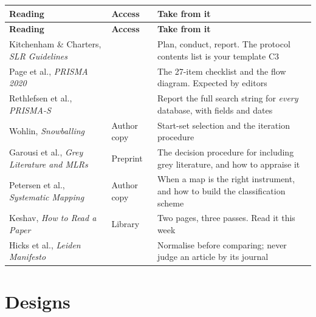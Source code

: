 \begin{center}
\small
\begin{longtable}{@{}L{4.4cm}L{1.8cm}L{7.6cm}@{}}
\toprule
\textbf{Reading} & \textbf{Access} & \textbf{Take from it} \\
\midrule
\endfirsthead
\toprule
\textbf{Reading} & \textbf{Access} & \textbf{Take from it} \\
\midrule
\endhead
\bottomrule
\endfoot
Kitchenham \& Charters, \emph{SLR Guidelines}~\cite{kitchenham2007guidelines}
  & \oa{}
  & Plan, conduct, report. The protocol contents list is your template C3 \\
Page et al., \emph{PRISMA 2020}~\cite{page2021prisma}
  & \oa{}
  & The 27-item checklist and the flow diagram. Expected by editors \\
Rethlefsen et al., \emph{PRISMA-S}~\cite{rethlefsen2021prisma}
  & \oa{}
  & Report the full search string for \emph{every} database, with fields and
    dates \\
Wohlin, \emph{Snowballing}~\cite{wohlin2014guidelines}
  & Author copy
  & Start-set selection and the iteration procedure \\
Garousi et al., \emph{Grey Literature and MLRs}~\cite{garousi2019guidelines}
  & Preprint
  & The decision procedure for including grey literature, and how to appraise
    it \\
Petersen et al., \emph{Systematic Mapping}~\cite{petersen2015guidelines}
  & Author copy
  & When a map is the right instrument, and how to build the classification
    scheme \\
Keshav, \emph{How to Read a Paper}~\cite{keshav2007read}
  & Library
  & Two pages, three passes. Read it this week \\
Hicks et al., \emph{Leiden Manifesto}~\cite{hicks2015leiden}
  & \oa{}
  & Normalise before comparing; never judge an article by its journal \\
\end{longtable}
\end{center}

\section{Designs}

